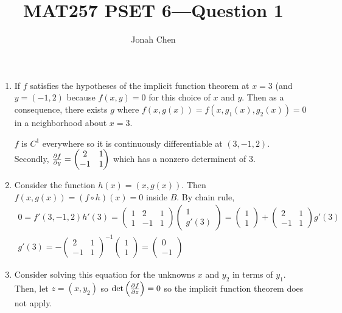 \documentclass{exam}
\title{MAT257 PSET 6---Question 1}
\author{Jonah Chen}
\numberwithin{equation}{section}
\begin{document}
    \sffamily
    \maketitle
    \begin{enumerate}[label=(\alph*)]
        \item If $f$ satisfies the hypotheses of the implicit function theorem at $x=3$ (and $y=(-1,2)$ because $f(x,y)=0$ for this choice of $x$ and $y$. Then as a consequence, there exists $g$ where $f(x,g(x))=f(x,g_1(x),g_2(x))=0$ in a neighborhood about $x=3$. 
        
        $f$ is $C^1$ everywhere so it is continuously differentiable at $(3,-1,2)$. Secondly, $\partialderivative{f}{y}(3,-1,2)=\begin{pmatrix}
            2&1\\-1&1
        \end{pmatrix}$ which has a nonzero determinent of 3.
        
        \item Consider the function $h(x)=(x,g(x))$. Then $f(x,g(x))=(f\circ h)(x)=0$ inside $B$. By chain rule,
        \begin{align*}
            0=f'(3,-1,2)h'(3)=\begin{pmatrix}
                1 & 2 & 1\\1 & -1 & 1
            \end{pmatrix}\begin{pmatrix}
                1\\g'(3)
            \end{pmatrix}=\begin{pmatrix}
                1\\1
            \end{pmatrix}+\begin{pmatrix}
                2&1\\-1&1
            \end{pmatrix}g'(3)\\
            g'(3)=-\begin{pmatrix}
                2&1\\-1&1
            \end{pmatrix}^{-1}\begin{pmatrix}
                1\\1
            \end{pmatrix}=\begin{pmatrix}
                0\\-1
            \end{pmatrix}
        \end{align*}
        
        \item Consider solving this equation for the unknowns $x$ and $y_2$ in terms of $y_1$. Then, let $z=(x,y_2)$ so $\det\left(\partialderivative{f}{z}\right)=0$ so the implicit function theorem does not apply.
    \end{enumerate}
\end{document}

